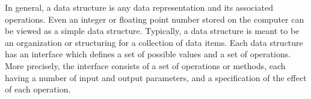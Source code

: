 In general, a data structure is any data representation and its
associated operations. Even an integer or floating point number stored on the computer can be viewed as a simple data structure. Typically, a data structure is meant to be an organization or structuring for a collection of data items. 
 Each data structure has an interface which defines a set of possible values and a set of operations. 
 More precisely, the interface consists of a set of operations or methods, each having a number of input and output parameters, and a specification of the effect of each operation. 

